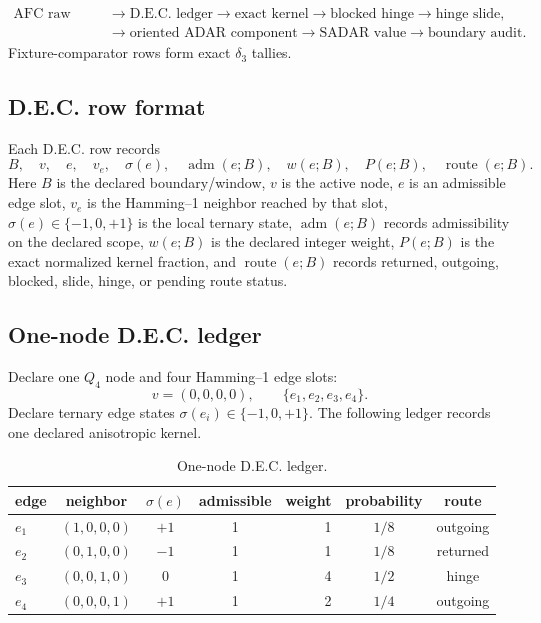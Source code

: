 \[
\begin{aligned}
\text{AFC raw node}
&\to \text{D.E.C. ledger}
\to \text{exact kernel}
\to \text{blocked hinge}
\to \text{hinge slide},\\
&\to \text{oriented ADAR component}
\to \text{SADAR value}
\to \text{boundary audit}.
\end{aligned}
\]
Fixture-comparator rows form exact \(\delta_3\) tallies.

\subsection{D.E.C. row format}\label{manual:dec-ledger:row-format}
Each D.E.C. row records
\[
B,
\quad
v,
\quad
e,
\quad
v_e,
\quad
\sigma(e),
\quad
\operatorname{adm}(e;B),
\quad
w(e;B),
\quad
P(e;B),
\quad
\operatorname{route}(e;B).
\]
Here \(B\) is the declared boundary/window, \(v\) is the active node, \(e\) is an admissible edge slot, \(v_e\) is the Hamming--1 neighbor reached by that slot, \(\sigma(e)\in\{-1,0,+1\}\) is the local ternary state, \(\operatorname{adm}(e;B)\) records admissibility on the declared scope, \(w(e;B)\) is the declared integer weight, \(P(e;B)\) is the exact normalized kernel fraction, and \(\operatorname{route}(e;B)\) records returned, outgoing, blocked, slide, hinge, or pending route status.

\subsection{One-node D.E.C. ledger}\label{manual:dec-ledger:one-node}
Declare one \(Q_4\) node and four Hamming--1 edge slots:
\[
v=(0,0,0,0),
\qquad
\{e_1,e_2,e_3,e_4\}.
\]
Declare ternary edge states \(\sigma(e_i)\in\{-1,0,+1\}\). The following ledger records one declared anisotropic kernel.
\begin{table}[H]
\centering
\scriptsize
\caption{One-node D.E.C. ledger.}
\begin{tabular}{l c c c r c c}
\toprule
edge & neighbor & $\sigma(e)$ & admissible & weight & probability & route\\
\midrule
$e_1$ & $(1,0,0,0)$ & $+1$ & 1 & 1 & $1/8$ & outgoing\\
$e_2$ & $(0,1,0,0)$ & $-1$ & 1 & 1 & $1/8$ & returned\\
$e_3$ & $(0,0,1,0)$ & $0$ & 1 & 4 & $1/2$ & hinge\\
$e_4$ & $(0,0,0,1)$ & $+1$ & 1 & 2 & $1/4$ & outgoing\\
\bottomrule
\end{tabular}
\label{tab:manual-dec-one-node-ledger}
\end{table}

